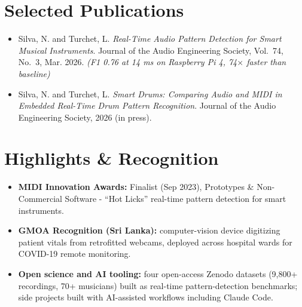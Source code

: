 \documentclass[11pt]{article}
\begin{document}
\section*{Selected Publications \footnotesize {}}
\begin{itemize}[leftmargin=1.2em, itemsep=-0.25em]
    \item Silva, N. and Turchet, L. \textit{Real-Time Audio Pattern Detection for Smart Musical Instruments}. Journal of the Audio Engineering Society, Vol.~74, No.~3, Mar. 2026. \textit{(F1 0.76 at 14 ms on Raspberry Pi 4, 74$\times$ faster than baseline)}
    \item Silva, N. and Turchet, L. \textit{Smart Drums: Comparing Audio and MIDI in Embedded Real-Time Drum Pattern Recognition}. Journal of the Audio Engineering Society, 2026 (in press).
\end{itemize}

\enlargethispage{3\baselineskip}
\vspace{-0.5em}
\section*{Highlights \& Recognition}
\begin{itemize}[leftmargin=1.2em, itemsep=-0.25em]
    \item \textbf{MIDI Innovation Awards:} Finalist (Sep 2023), Prototypes \& Non-Commercial Software - ``Hot Licks'' real-time pattern detection for smart instruments.
    \item \textbf{GMOA Recognition (Sri Lanka):} computer-vision device digitizing patient vitals from retrofitted webcams, deployed across hospital wards for COVID-19 remote monitoring.
    \item \textbf{Open science and AI tooling:} four open-access Zenodo datasets (9,800+ recordings, 70+ musicians) built as real-time pattern-detection benchmarks; side projects built with AI-assisted workflows including Claude Code.
\end{itemize}
\end{document}
